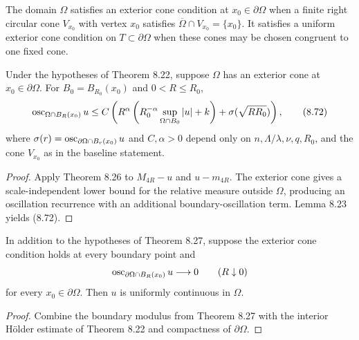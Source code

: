 \begin{definition}
\label{gt-def-8-exterior-cone-condition}
The domain $\Omega$ satisfies an exterior cone condition at
$x_0\in\partial\Omega$ when a finite right circular cone $V_{x_0}$ with vertex
$x_0$ satisfies $\overline\Omega\cap V_{x_0}=\{x_0\}$. It satisfies a uniform
exterior cone condition on $T\subset\partial\Omega$ when these cones may be
chosen congruent to one fixed cone.
\end{definition}

\begin{theorem}
\label{gt-thm-8-27-boundary-oscillation}
Under the hypotheses of Theorem 8.22, suppose $\Omega$ has an exterior cone at
$x_0\in\partial\Omega$. For $B_0=B_{R_0}(x_0)$ and $0<R\leq R_0$,
\begin{equation}
\operatorname{osc}_{\Omega\cap B_R(x_0)}u
\leq C\left(R^\alpha
\left(R_0^{-\alpha}\sup_{\Omega\cap B_0}|u|+k\right)
+\sigma(\sqrt{RR_0})\right),
\tag{8.72}
\end{equation}
where $\sigma(r)=\operatorname{osc}_{\partial\Omega\cap B_r(x_0)}u$ and $C,\alpha>0$
depend only on $n,\Lambda/\lambda,\nu,q,R_0$, and the cone $V_{x_0}$ as in
the baseline statement.
\end{theorem}
\begin{proof}
\sketch Apply Theorem 8.26 to $M_{4R}-u$ and $u-m_{4R}$. The exterior cone gives
a scale-independent lower bound for the relative measure outside $\Omega$,
producing an oscillation recurrence with an additional boundary-oscillation
term. Lemma 8.23 yields (8.72).
\end{proof}

\begin{corollary}
\label{gt-cor-8-28-uniform-boundary-continuity}
In addition to the hypotheses of Theorem 8.27, suppose the exterior cone
condition holds at every boundary point and
\[
\operatorname{osc}_{\partial\Omega\cap B_R(x_0)}u\longrightarrow0
\qquad(R\downarrow0)
\]
for every $x_0\in\partial\Omega$. Then $u$ is uniformly continuous in $\Omega$.
\end{corollary}
\begin{proof}
\sketch Combine the boundary modulus from Theorem 8.27 with the interior
H\"older estimate of Theorem 8.22 and compactness of $\partial\Omega$.
\end{proof}

